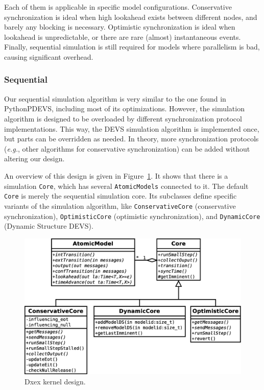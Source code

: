 Each of them is applicable in specific model configurations.
Conservative synchronization is ideal when high lookahead exists between different nodes, and barely any blocking is necessary.
Optimistic synchronization is ideal when lookahead is unpredictable, or there are rare (almost) instantaneous events.
Finally, sequential simulation is still required for models where parallelism is bad, causing significant overhead.

\subsubsection{Sequential}
Our sequential simulation algorithm is very similar to the one found in PythonPDEVS, including most of its optimizations.
However, the simulation algorithm is designed to be overloaded by different synchronization protocol implementations.
This way, the \textsf{DEVS} simulation algorithm is implemented once, but parts can be overridden as needed.
In theory, more synchronization protocols (\textit{e.g.}, other algorithms for conservative synchronization) can be added without altering our design.

An overview of this design is given in Figure~\ref{fig:class_diagram}.
It shows that there is a simulation \texttt{Core}, which has several \texttt{AtomicModels} connected to it.
The default \texttt{Core} is merely the sequential simulation core.
Its subclasses define specific variants of the simulation algorithm, like \texttt{ConservativeCore} (conservative synchronization), \texttt{OptimisticCore} (optimistic synchronization), and \texttt{DynamicCore} (\textsf{Dynamic Structure DEVS}).

\begin{figure}
    \includegraphics[width=\columnwidth]{fig/cores_class_diagram.eps}
	\caption{Dxex kernel design.}
	\label{fig:class_diagram}
\end{figure}

